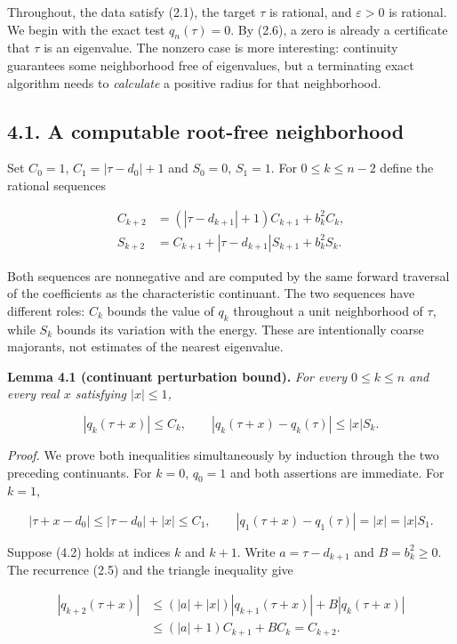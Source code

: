 \documentclass[
  11pt,
]{article}
\begin{document}
Throughout, the data satisfy (2.1), the target \(\tau\) is rational, and
\(\varepsilon>0\) is rational. We begin with the exact test
\(q_n(\tau)=0\). By (2.6), a zero is already a certificate that \(\tau\)
is an eigenvalue. The nonzero case is more interesting: continuity
guarantees some neighborhood free of eigenvalues, but a terminating
exact algorithm needs to \emph{calculate} a positive radius for that
neighborhood.

\subsection{4.1. A computable root-free
neighborhood}\label{a-computable-root-free-neighborhood}

Set \(C_0=1\), \(C_1=|\tau-d_0|+1\) and \(S_0=0\), \(S_1=1\). For
\(0\le k\le n-2\) define the rational sequences

\[
\begin{aligned}
C_{k+2}&=(|\tau-d_{k+1}|+1)C_{k+1}+b_k^2C_k,\\
S_{k+2}&=C_{k+1}+|\tau-d_{k+1}|S_{k+1}+b_k^2S_k.
\end{aligned}
\tag{4.1}
\]

Both sequences are nonnegative and are computed by the same forward
traversal of the coefficients as the characteristic continuant. The two
sequences have different roles: \(C_k\) bounds the value of \(q_k\)
throughout a unit neighborhood of \(\tau\), while \(S_k\) bounds its
variation with the energy. These are intentionally coarse majorants, not
estimates of the nearest eigenvalue.

\textbf{Lemma 4.1 (continuant perturbation bound).} \emph{For every
\(0\le k\le n\) and every real \(x\) satisfying \(|x|\le1\),}

\[
|q_k(\tau+x)|\le C_k,
\qquad
|q_k(\tau+x)-q_k(\tau)|\le |x|S_k.
\tag{4.2}
\]

\emph{Proof.} We prove both inequalities simultaneously by induction
through the two preceding continuants. For \(k=0\), \(q_0=1\) and both
assertions are immediate. For \(k=1\),

\[
|\tau+x-d_0|\le|\tau-d_0|+|x|\le C_1,
\qquad
|q_1(\tau+x)-q_1(\tau)|=|x|=|x|S_1.
\]

Suppose (4.2) holds at indices \(k\) and \(k+1\). Write
\(a=\tau-d_{k+1}\) and \(B=b_k^2\ge0\). The recurrence (2.5) and the
triangle inequality give

\[
\begin{aligned}
|q_{k+2}(\tau+x)|
&\le (|a|+|x|)|q_{k+1}(\tau+x)|
       +B|q_k(\tau+x)|\\
&\le (|a|+1)C_{k+1}+BC_k=C_{k+2}.
\end{aligned}
\]
\end{document}
